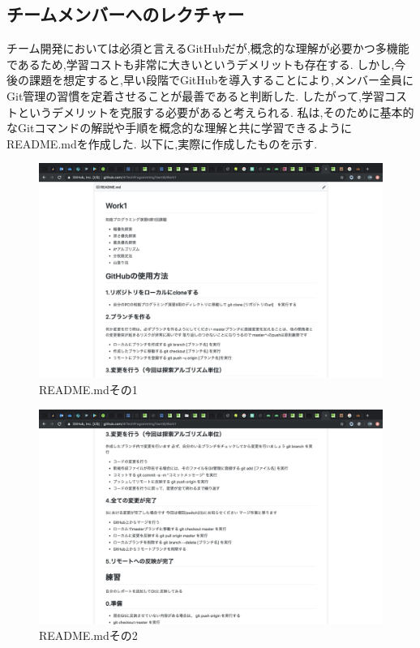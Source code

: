 \documentclass[uplatex,12pt]{jsarticle}
\begin{document}
\newpage


\subsection{チームメンバーへのレクチャー}
チーム開発においては必須と言えるGitHubだが,概念的な理解が必要かつ多機能であるため,学習コストも非常に大きいというデメリットも存在する.
しかし,今後の課題を想定すると,早い段階でGitHubを導入することにより,メンバー全員にGit管理の習慣を定着させることが最善であると判断した.
したがって,学習コストというデメリットを克服する必要があると考えられる.
私は,そのために基本的なGitコマンドの解説や手順を概念的な理解と共に学習できるようにREADME.mdを作成した.
以下に,実際に作成したものを示す.

\begin{figure}[!hbt]
  \centering
  \includegraphics[scale=0.20]{git_image/read_me_1.png}
  \caption{README.mdその1}
\end{figure}

\begin{figure}[!hbt]
  \centering
  \includegraphics[scale=0.20]{git_image/read_me_2.png}
  \caption{README.mdその2}
\end{figure}
\end{document}
